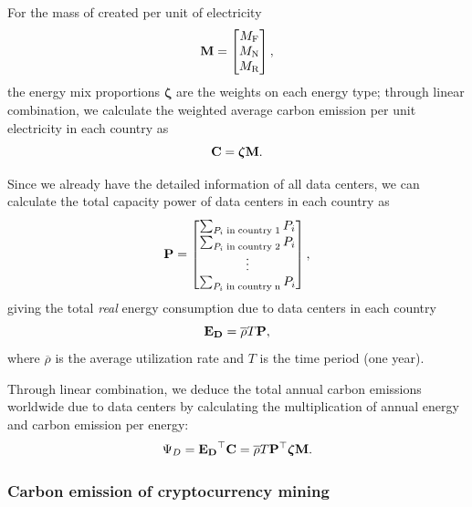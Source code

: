 \documentclass[12pt]{article}
\begin{document}
For the mass of  created per unit of electricity
\begin{equation}
	\vb{M} = \begin{bmatrix}
		M_{\rm F} \\
		M_{\rm N} \\
		M_{\rm R} \\
	\end{bmatrix},
\end{equation}
the energy mix proportions $\boldsymbol{\zeta}$ are the weights on each energy type; through linear combination, we calculate the weighted average carbon emission per unit electricity in each country as
\begin{equation}
	\vb{C} = \boldsymbol{\zeta} \vb{M}.
\end{equation}

Since we already have the detailed information of all data centers, we can calculate the total capacity power of data centers in each country as
\begin{equation}
	\vb{P} = \begin{bmatrix}
		\sum_{P_i \rm\;in\;country\;1} P_i \\
		\sum_{P_i \rm\;in\;country\;2} P_i \\
		\vdots \\
		\sum_{P_i \rm\;in\;country\;n} P_i \\
	\end{bmatrix},
\end{equation}
giving the total \textit{real} energy consumption due to data centers in each country
\begin{equation}
	\vb{E_D} = \overline{\rho} T \vb{P},
\end{equation}
where $\overline{\rho}$ is the average utilization rate and $T$ is the time period (one year).

Through linear combination, we deduce the total annual carbon emissions worldwide due to data centers by calculating the multiplication of annual energy and carbon emission per energy:
\begin{equation}
	\Psi_D = \vb{E_D}^\top \vb{C} = \overline{\rho} T \vb{P}^\top \boldsymbol{\zeta} \vb{M}.
	\label{eq_dc_emission}
\end{equation}

\subsubsection{Carbon emission of cryptocurrency mining}
\end{document}
